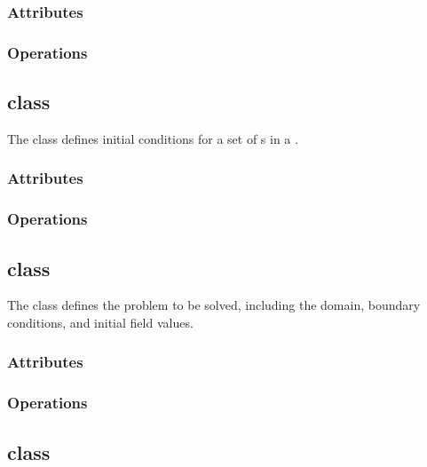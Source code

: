 \documentclass{article}
\begin{document}
\subsubsection{Attributes}

\subsubsection{Operations}

\subsection{ class}

The  class defines initial conditions for a set of
s in a .


\subsubsection{Attributes}

\subsubsection{Operations}

\subsection{ class}

The  class defines the problem to be solved, including
the domain, boundary conditions, and initial field values.


\subsubsection{Attributes}

\subsubsection{Operations}

\subsection{ class} \label{ss:field}
\end{document}
